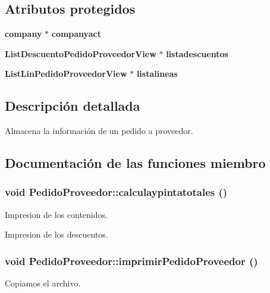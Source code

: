 \subsection*{Atributos protegidos}
\begin{CompactItemize}
\item 
{\bf company} $\ast$ {\bf companyact}\label{classPedidoProveedor_p0}

\item 
{\bf List\-Descuento\-Pedido\-Proveedor\-View} $\ast$ {\bf listadescuentos}\label{classPedidoProveedor_p1}

\item 
{\bf List\-Lin\-Pedido\-Proveedor\-View} $\ast$ {\bf listalineas}\label{classPedidoProveedor_p2}

\end{CompactItemize}


\subsection{Descripci\'{o}n detallada}
Almacena la informaci\'{o}n de un pedido a proveedor. 



\subsection{Documentaci\'{o}n de las funciones miembro}
\subsubsection{\setlength{\rightskip}{0pt plus 5cm}void Pedido\-Proveedor::calculaypintatotales ()}\label{classPedidoProveedor_a1}


Impresion de los contenidos.

Impresion de los descuentos. 
\subsubsection{\setlength{\rightskip}{0pt plus 5cm}void Pedido\-Proveedor::imprimir\-Pedido\-Proveedor ()}\label{classPedidoProveedor_a6}


Copiamos el archivo.

